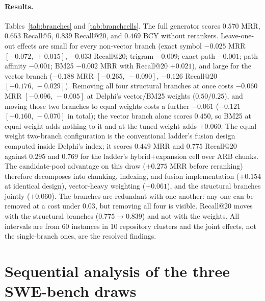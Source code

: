 \documentclass{article}
\newcommand{\ci}[2]{{\footnotesize$[#1,\,#2]$}}
\newcommand{\system}{Delphi}
\begin{document}
\paragraph{Results.} Tables~\ref{tab:branches} and \ref{tab:branchcells}. The full generator scores $0.570$ MRR, $0.653$ Recall@5, $0.839$ Recall@20, and $0.469$ BCY without rerankers. Leave-one-out effects are small for every non-vector branch (exact symbol $-0.025$ MRR \ci{-0.072}{+0.015}, $-0.033$ Recall@20; trigram $-0.009$; exact path $-0.001$; path affinity $-0.001$; BM25 $-0.002$ MRR with Recall@20 $+0.021$), and large for the vector branch ($-0.188$ MRR \ci{-0.265}{-0.090}, $-0.126$ Recall@20 \ci{-0.176}{-0.029}). Removing all four structural branches at once costs $-0.060$ MRR \ci{-0.096}{-0.005} at \system{}'s vector/BM25 weights ($0.50/0.25$), and moving those two branches to equal weights costs a further $-0.061$ ($-0.121$ \ci{-0.160}{-0.070} in total); the vector branch alone scores $0.450$, so BM25 at equal weight adds nothing to it and at the tuned weight adds $+0.060$. The equal-weight two-branch configuration is the conventional ladder's fusion design computed inside \system{}'s index; it scores $0.449$ MRR and $0.775$ Recall@20 against $0.295$ and $0.769$ for the ladder's hybrid+expansion cell over ARB chunks. The candidate-pool advantage on this draw ($+0.275$ MRR before reranking) therefore decomposes into chunking, indexing, and fusion implementation ($+0.154$ at identical design), vector-heavy weighting ($+0.061$), and the structural branches jointly ($+0.060$). The branches are redundant with one another: any one can be removed at a cost under $0.03$, but removing all four is visible. Recall@20 moves with the structural branches ($0.775\to0.839$) and not with the weights. All intervals are from 60 instances in 10 repository clusters and the joint effects, not the single-branch ones, are the resolved findings.

\begin{table}[h]
\centering
\caption{Branch-ablation cell means on the fresh draw. Bold marks the best value per metric.}
\label{tab:branchcells}
\footnotesize
\setlength{\tabcolsep}{4pt}
\resizebox{\textwidth}{!}{}
\end{table}

\section{Sequential analysis of the three SWE-bench draws}
\label{app:sequential}
\end{document}
